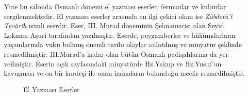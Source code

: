 \indent Yine bu salonda Osmanlı dönemi el yazması eserler, fermanlar ve kuburlar sergilenmektedir. El yazması eserler arasında en ilgi çekici olanı ise \textit{Zübdetü't Tevârîh} isimli eserdir. Eser, III. Murad döneminin Şehnamecisi olan Seyid Lokman Aşuri tarafından yazılmıştır. Eserde, peygamberler ve hükümdarların yaşamlarında vuku bulmuş önemli tarihi olaylar anlatılmış ve minyatür şeklinde resmedilmiştir. III.Murad'a kadar olan bütün Osmanlı padişahlarına da yer veilmiştir. Eserin açık sayfasındaki minyatürde Hz.Yakup ve Hz.Yusuf'un kavuşması ve  on bir kardeşi ile onan inanaların bulunduğu meclis resmedilmiştir.\newline
\begin{figure}[H]
    \centering
    \hspace{10pt}
    \caption{El Yazması Eserler}
\end{figure}
